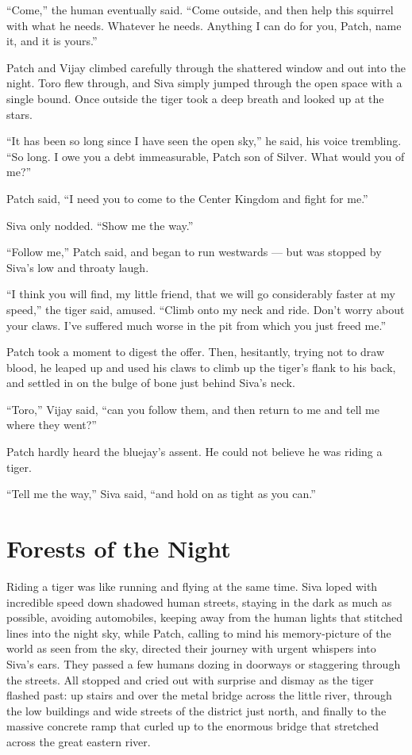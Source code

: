 \documentclass[ebook,oneside,openany,12pt]{memoir}
\begin{document}
“Come,” the human eventually said. “Come outside, and then help this
squirrel with what he needs. Whatever he needs. Anything I can do for
you, Patch, name it, and it is yours.”

Patch and Vijay climbed carefully through the shattered window and out
into the night. Toro flew through, and Siva simply jumped through the
open space with a single bound. Once outside the tiger took a deep
breath and looked up at the stars.

“It has been so long since I have seen the open sky,” he said, his
voice trembling. “So long. I owe you a debt immeasurable, Patch son of
Silver. What would you of me?”

Patch said, “I need you to come to the Center Kingdom and fight for
me.”

Siva only nodded. “Show me the way.”

“Follow me,” Patch said, and began to run westwards — but was stopped
by Siva’s low and throaty laugh.

“I think you will find, my little friend, that we will go considerably
faster at my speed,” the tiger said, amused. “Climb onto my neck and
ride. Don’t worry about your claws. I’ve suffered much worse in the
pit from which you just freed me.”

Patch took a moment to digest the offer. Then, hesitantly, trying not
to draw blood, he leaped up and used his claws to climb up the tiger’s
flank to his back, and settled in on the bulge of bone just behind
Siva’s neck.

“Toro,” Vijay said, “can you follow them, and then return to me and
tell me where they went?”

Patch hardly heard the bluejay’s assent. He could not believe he was
riding a tiger.

“Tell me the way,” Siva said, “and hold on as tight as you can.”


\section{Forests of the Night}

Riding a tiger was like running and flying at the same time. Siva
loped with incredible speed down shadowed human streets, staying in
the dark as much as possible, avoiding automobiles, keeping away from
the human lights that stitched lines into the night sky, while Patch,
calling to mind his memory-picture of the world as seen from the sky,
directed their journey with urgent whispers into Siva’s ears. They
passed a few humans dozing in doorways or staggering through the
streets. All stopped and cried out with surprise and dismay as the
tiger flashed past: up stairs and over the metal bridge across the
little river, through the low buildings and wide streets of the
district just north, and finally to the massive concrete ramp that
curled up to the enormous bridge that stretched across the great
eastern river.
\end{document}
